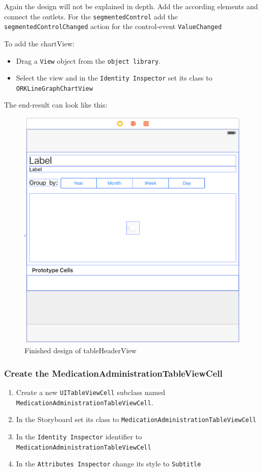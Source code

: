 \documentclass{article}
\begin{document}
Again the design will not be explained in depth. Add the according
elements and connect the outlets. For the \texttt{segmentedControl} add
the \texttt{segmentedControlChanged} action for the control-event
\texttt{ValueChanged}

To add the chartView:
\begin{itemize}
  \item
    Drag a \texttt{View} object from the \texttt{object\ library}.
  \item
    Select the view and in the \texttt{Identity\ Inspector} set its class to \texttt{ORKLineGraphChartView}
\end{itemize}
The end-result can look like this:
\begin{figure}[H]
\centering
\includegraphics[width=\linewidth]{resources/step7/header_view.png}
\caption{Finished design of tableHeaderView}
\label{fig:table-headerview}
\end{figure}

\subsubsection{Create the MedicationAdministrationTableViewCell}\label{create-the-medicationadministrationtableviewcell}
\begin{enumerate}
  \item
    Create a new \texttt{UITableViewCell} subclass named \texttt{MedicationAdministrationTableViewCell}.
  \item
    In the Storyboard set its class to \texttt{MedicationAdministrationTableViewCell}
  \item
    In the \texttt{Identity\ Inspector} identifier to \texttt{MedicationAdministrationTableViewCell}
  \item
    In the \texttt{Attributes\ Inspector} change its style to \texttt{Subtitle}
\end{enumerate}
\end{document}
